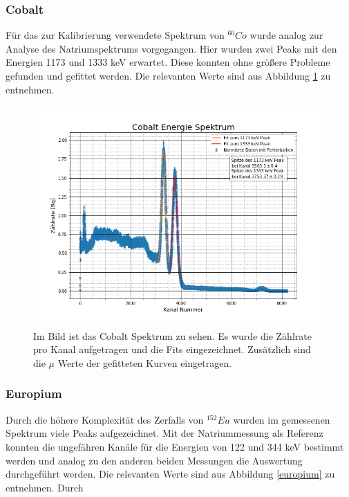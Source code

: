 \subsubsection{Cobalt}
Für das zur Kalibrierung verwendete Spektrum von $^{60}Co$ wurde analog zur Analyse des Natriumspektrums vorgegangen. Hier wurden zwei Peaks mit den Energien 1173 und 1333 keV erwartet. Diese konnten ohne größere Probleme gefunden und gefittet werden. Die relevanten Werte sind aus Abbildung \ref{cobalt} zu entnehmen. 
\begin{figure}[h]
	\centering
	\includegraphics[scale=0.5]{Bilder/Cobalt}
	\caption[Cobalt Spektrum mit Peaks]{\small Im Bild ist das Cobalt Spektrum zu sehen. Es wurde die Zählrate pro Kanal aufgetragen und die Fits eingezeichnet. Zusätzlich sind die $\mu$ Werte der gefitteten Kurven eingetragen.}
	\label{cobalt}
\end{figure}
\subsubsection{Europium}
Durch die höhere Komplexität des Zerfalls von $^{152}Eu$ wurden im gemessenen Spektrum viele Peaks aufgezeichnet. Mit der Natriummessung als Referenz konnten die ungefähren Kanäle für die Energien von 122 und 344 keV bestimmt werden und analog zu den anderen beiden Messungen die Auswertung durchgeführt werden. Die relevanten Werte sind aus Abbildung \ref{europium} zu entnehmen. Durch

